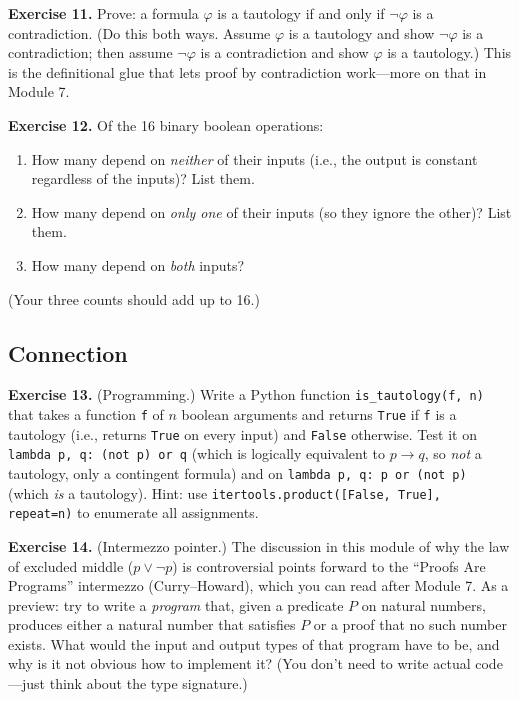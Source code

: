 \documentclass[11pt]{article}
\begin{document}
\bigskip
\textbf{Exercise 11.}\label{ex:m2:11} Prove: a formula $\varphi$ is a tautology if and only if $\lnot \varphi$ is a contradiction. (Do this both ways. Assume $\varphi$ is a tautology and show $\lnot \varphi$ is a contradiction; then assume $\lnot \varphi$ is a contradiction and show $\varphi$ is a tautology.) This is the definitional glue that lets proof by contradiction work---more on that in Module 7.

\bigskip
\textbf{Exercise 12.}\label{ex:m2:12} Of the 16 binary boolean operations:
\begin{enumerate}[label=(\alph*)]
  \item How many depend on \emph{neither} of their inputs (i.e., the output is constant regardless of the inputs)? List them.
  \item How many depend on \emph{only one} of their inputs (so they ignore the other)? List them.
  \item How many depend on \emph{both} inputs?
\end{enumerate}
(Your three counts should add up to 16.)

\subsection*{Connection}

\textbf{Exercise 13.}\label{ex:m2:13} (Programming.) Write a Python function \texttt{is\_tautology(f, n)} that takes a function \texttt{f} of $n$ boolean arguments and returns \texttt{True} if \texttt{f} is a tautology (i.e., returns \texttt{True} on every input) and \texttt{False} otherwise. Test it on \texttt{lambda p, q: (not p) or q} (which is logically equivalent to $p \to q$, so \emph{not} a tautology, only a contingent formula) and on \texttt{lambda p, q: p or (not p)} (which \emph{is} a tautology). Hint: use \texttt{itertools.product([False, True], repeat=n)} to enumerate all assignments.

\bigskip
\textbf{Exercise 14.}\label{ex:m2:14} (Intermezzo pointer.) The discussion in this module of why the law of excluded middle ($p \vee \lnot p$) is controversial points forward to the ``Proofs Are Programs'' intermezzo (Curry--Howard), which you can read after Module 7. As a preview: try to write a \emph{program} that, given a predicate $P$ on natural numbers, produces either a natural number that satisfies $P$ or a proof that no such number exists. What would the input and output types of that program have to be, and why is it not obvious how to implement it? (You don't need to write actual code---just think about the type signature.)
\end{document}
